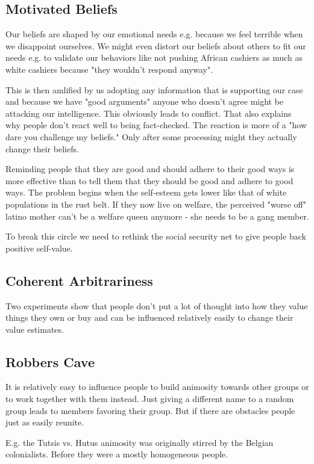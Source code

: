 \documentclass[a4paper, twocolumn]{article}
\begin{document}
\subsection[Motivated Beliefs]{Motivated Beliefs \cite{motivated-beliefs}}
Our beliefs are shaped by our emotional needs e.g. because we feel terrible when we disappoint ourselves. We might even distort our beliefs about others to fit our needs e.g. to validate our behaviors like not pushing African cashiers as much as white cashiers because "they wouldn't respond anyway".

This is then amlified by us adopting any information that is supporting our case and because we have "good arguments" anyone who doesn't agree might be attacking our intelligence. This obviously leads to conflict.
That also explains why people don't react well to being fact-checked. The reaction is more of a "how dare you challenge my beliefs." Only after some processing might they actually change their beliefs.

Reminding people that they are good and should adhere to their good ways is more effective than to tell them that they should be good and adhere to good ways. The problem begins when the self-esteem gets lower like that of white populations in the rust belt. If they now live on welfare, the perceived "worse off" latino mother can't be a welfare queen anymore - she needs to be a gang member.

To break this circle we need to rethink the social security net to give people back positive self-value.

\subsection{Coherent Arbitrariness}
Two experiments show that people don't put a lot of thought into how they value things they own or buy and can be influenced relatively easily to change their value estimates.

\subsection{Robbers Cave}
It is relatively easy to influence people to build animosity towards other groups or to work together with them instead. Just giving a different name to a random group leads to members favoring their group. But if there are obstacles people just as easily reunite.

E.g. the Tutsis vs. Hutus animosity was originally stirred by the Belgian colonialists. Before they were a mostly homogeneous people. 
\end{document}
